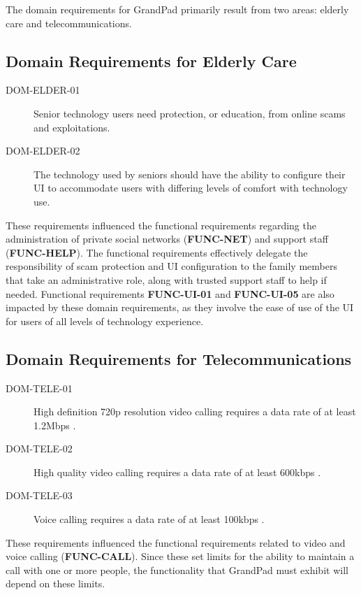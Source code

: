 The domain requirements for GrandPad primarily result from two areas:
    elderly care
    and telecommunications.

\subsection*{Domain Requirements for Elderly Care}

\begin{description}
    \item[DOM-ELDER-01]
        Senior technology users need protection, or education, from online scams
            and exploitations.
    \item[DOM-ELDER-02]
        The technology used by seniors should have the ability to configure
            their UI to accommodate users with differing levels of comfort with
            technology use.
\end{description}

These requirements influenced the functional requirements regarding the
    administration of private social networks (\textbf{FUNC-NET}) and support
    staff (\textbf{FUNC-HELP}).
The functional requirements effectively delegate the responsibility of scam
    protection and UI configuration to the family members that take an
    administrative role, along with trusted support staff to help if needed.
Functional requirements \textbf{FUNC-UI-01} and \textbf{FUNC-UI-05} are also
    impacted by these domain requirements, as they involve the ease of use of
    the UI for users of all levels of technology experience.

\subsection*{Domain Requirements for Telecommunications}

\begin{description}
    \item[DOM-TELE-01]
        High definition 720p resolution video calling requires a data rate of at
            least 1.2Mbps \cite{zoom_system_requirements}.
    \item[DOM-TELE-02]
        High quality video calling requires a data rate of at least 600kbps
            \cite{zoom_system_requirements}.
    \item[DOM-TELE-03]
        Voice calling requires a data rate of at least 100kbps
            \cite{zoom_system_requirements}.
\end{description}

These requirements influenced the functional requirements related to video and
    voice calling (\textbf{FUNC-CALL}).
Since these set limits for the ability to maintain a call with one or more
    people, the functionality that GrandPad must exhibit will depend on these
    limits.

